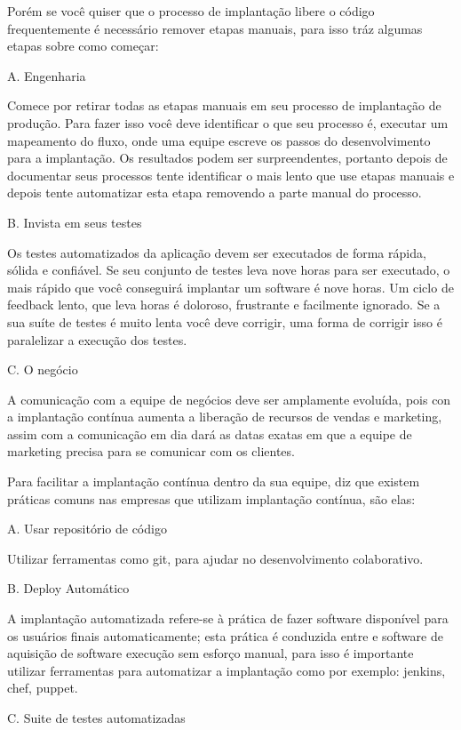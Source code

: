 \documentclass[12pt]{article}
\begin{document}
Porém se você quiser que o processo de implantação libere o código frequentemente é necessário remover
etapas manuais, para isso \cite{6612887} tráz algumas etapas sobre como começar:


A. Engenharia

Comece por retirar todas as etapas manuais em seu processo de implantação de produção. Para fazer isso você deve identificar o que seu processo é, executar um mapeamento do fluxo, onde uma equipe escreve os passos do desenvolvimento para a implantação. Os resultados podem ser surpreendentes, portanto depois de documentar seus processos tente identificar o mais lento que use etapas manuais e depois tente automatizar esta etapa removendo a parte manual do processo.


B. Invista em seus testes

Os testes automatizados da aplicação devem ser executados de forma rápida, sólida e confiável. Se seu
conjunto de testes leva nove horas para ser executado, o mais rápido que você conseguirá implantar um software  é nove horas. Um ciclo de feedback lento, que leva horas é doloroso, frustrante e facilmente ignorado. Se a sua suíte de testes é muito lenta você deve corrigir, uma forma de corrigir isso é paralelizar a execução dos testes.

C. O negócio

A comunicação com a equipe de negócios deve ser amplamente evoluída, pois con a implantação contínua aumenta a liberação de recursos de vendas e marketing, assim com a comunicação em dia dará as datas exatas em que
a equipe de marketing precisa para se comunicar com os clientes.

Para facilitar a implantação contínua dentro da sua equipe, \cite{7284592} diz que existem práticas comuns nas empresas que utilizam implantação contínua, são elas:

A. Usar repositório de código

Utilizar ferramentas como git, para ajudar no desenvolvimento colaborativo.

B. Deploy Automático

A implantação automatizada refere-se à prática de fazer
software disponível para os usuários finais automaticamente; esta prática é
conduzida entre e software de aquisição de software
execução sem esforço manual, para isso é importante utilizar ferramentas para automatizar a implantação como por exemplo: jenkins, chef, puppet.

C. Suite de testes automatizadas
\end{document}
